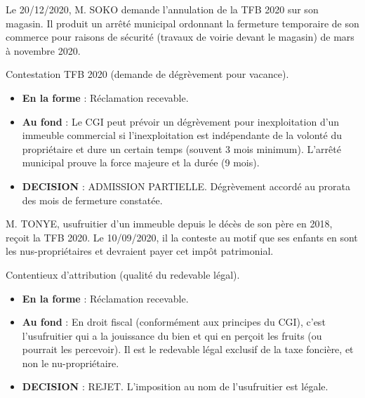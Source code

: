 \documentclass[a4paper, 11pt]{exam}
\begin{document}
\begin{questions}
		\question Le 20/12/2020, M. SOKO demande l'annulation de la TFB 2020 sur son magasin. Il produit un arrêté municipal ordonnant la fermeture temporaire de son commerce pour raisons de sécurité (travaux de voirie devant le magasin) de mars à novembre 2020.
		\begin{solution}
			Contestation TFB 2020 (demande de dégrèvement pour vacance).
			\begin{itemize}
				\item \textbf{En la forme} : Réclamation recevable.
				\item \textbf{Au fond} : Le CGI peut prévoir un dégrèvement pour inexploitation d'un immeuble commercial si l'inexploitation est indépendante de la volonté du propriétaire et dure un certain temps (souvent 3 mois minimum). L'arrêté municipal prouve la force majeure et la durée (9 mois).
				\item \textbf{DECISION} : ADMISSION PARTIELLE. Dégrèvement accordé au prorata des mois de fermeture constatée.
			\end{itemize}
		\end{solution}
		
		
		\question M. TONYE, usufruitier d'un immeuble depuis le décès de son père en 2018, reçoit la TFB 2020. Le 10/09/2020, il la conteste au motif que ses enfants en sont les nus-propriétaires et devraient payer cet impôt patrimonial.
		\begin{solution}
			Contentieux d'attribution (qualité du redevable légal).
			\begin{itemize}
				\item \textbf{En la forme} : Réclamation recevable.
				\item \textbf{Au fond} : En droit fiscal (conformément aux principes du CGI), c'est l'usufruitier qui a la jouissance du bien et qui en perçoit les fruits (ou pourrait les percevoir). Il est le redevable légal exclusif de la taxe foncière, et non le nu-propriétaire.
				\item \textbf{DECISION} : REJET. L'imposition au nom de l'usufruitier est légale.
			\end{itemize}
		\end{solution}
		

\end{questions}
\end{document}
